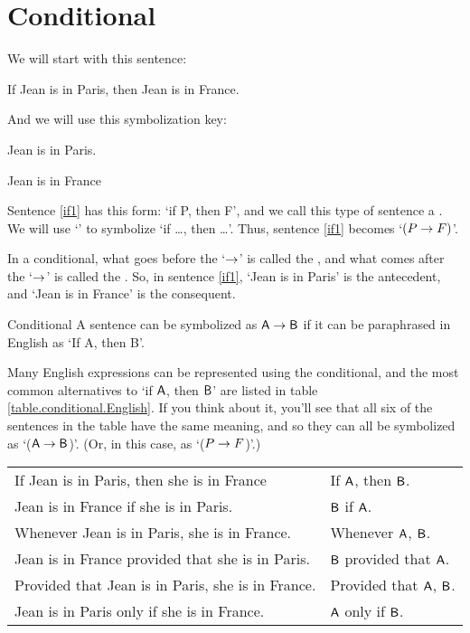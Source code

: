 \section{Conditional}

We will start with this sentence:
	\begin{earg}
		\item[\ex{if1}] If Jean is in Paris, then Jean is in France.
	\end{earg}
And we will use this symbolization key:
	\begin{ekey}
		\item[P] Jean is in Paris.
		\item[F] Jean is in France
	\end{ekey}
Sentence \ref{if1} has this form: `if P, then F', and we call this type of sentence a . We will use `\eif' to symbolize `if \ldots, then \ldots'. Thus, sentence \ref{if1} becomes `$(P\rightarrow F)$'. 

In a conditional, what goes before the `$\rightarrow$'  is called the , and what comes after the `$\rightarrow$' is called the . So, in sentence \ref{if1}, `Jean is in Paris' is the antecedent, and `Jean is in France' is the consequent.

\begin{factboxy}{Conditional}
		A sentence can be symbolized as $\mathsf{A} \rightarrow \mathsf{B}$ if it can be paraphrased in English as `If A, then B'.
\end{factboxy}

Many English expressions can be represented using the conditional, and the most common alternatives to `if $\mathsf{A}$, then $\mathsf{B}$' are listed in table \ref{table.conditional.English}. If you think about it, you'll see that all six of the sentences in the table have the same meaning, and so they can all be symbolized as `($\mathsf{A} \rightarrow \mathsf{B}$)'. (Or, in this case, as `($P \rightarrow F$)'.)


\begin{table*}\centering\sffamily\footnotesize
{}
\begin{tabular}{@{}l l@{}}\toprule
If Jean is in Paris, then she is in France & If $\mathsf{A}$, then $\mathsf{B}$.\\
Jean is in France if she is in Paris. 	&	$\mathsf{B}$ if $\mathsf{A}$.\\
Whenever Jean is in Paris, she is in France.  	&	Whenever $\mathsf{A}$, $\mathsf{B}$.\\
Jean is in France provided that she is in Paris. 	&	$\mathsf{B}$ provided that $\mathsf{A}$.\\
Provided that Jean is in Paris, she is in France. 	&	Provided that $\mathsf{A}$, $\mathsf{B}$.\\
Jean is in Paris only if she is in France. 	&	$\mathsf{A}$ only if $\mathsf{B}$.\\
\bottomrule
\end{tabular}
\caption{The most common way of expressing a conditional in English is as `If Jean is in Paris, then she is in France.' This table lists some alternative but equivalent ways of expressing the same sentence.}\label{table.conditional.English}
\end{table*}


